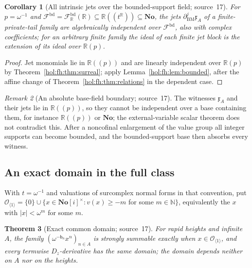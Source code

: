 \documentclass[11pt]{article}
\numberwithin{equation}{section}
\newtheorem{theorem}{Theorem}[section]
\newtheorem{corollary}[theorem]{Corollary}
\theoremstyle{definition}
\theoremstyle{remark}
\newtheorem{remark}[theorem]{Remark}
\newcommand{\R}{\mathbb R}
\newcommand{\N}{\mathbb N}
\newcommand{\No}{\mathbf{No}}
\newcommand{\abs}[1]{\lvert#1\rvert}
\begin{document}
\begin{corollary}[All intrinsic jets over the bounded-support field;
source~17]\label{hol:fh:cor:boundedjets}
For $p=\omega^{-1}$ and $\mathcal F^{\mathrm{bd}}=\mathcal F^{\mathrm{bd}}_\R(\R)
\subseteq\R((t^\R))\subseteq\No$, the jets $\partial_{\mathrm{BM}}^j\mathfrak x_A$
of a finite-private-tail family are algebraically independent over
$\mathcal F^{\mathrm{bd}}$, also with complex coefficients; for an arbitrary
finite family the ideal of each finite jet block is the extension of its
ideal over $\R(p)$.
\end{corollary}

\begin{proof}
Jet monomials lie in $\R((p))$ and are linearly independent over $\R(p)$ by
Theorem~\ref{hol:fh:thm:surreal}; apply Lemma~\ref{hol:fh:lem:bounded}, after
the affine change of Theorem~\ref{hol:fh:thm:relations} in the dependent case.
\end{proof}

\begin{remark}[An absolute base-field boundary; source~17]
\label{hol:fh:rem:absolute}
The witnesses $\mathfrak x_A$ and their jets lie in $\R((p))$, so they cannot be
independent over a base containing them, for instance $\R((p))$ or $\No$; the
external-variable scalar theorem does not contradict this. After a
noncofinal enlargement of the value group all integer supports can become
bounded, and the bounded-support base then absorbs every witness.
\end{remark}

\subsection{An exact domain in the full class}\label{hol:fh:sub:domain}

With $t=\omega^{-1}$ and valuations of surcomplex normal forms in that
convention, put
$\mathcal O_{\langle1\rangle}=\{0\}\cup\{x\in\No[i]^\times:v(x)\ge-m$ for some
$m\in\N\}$, equivalently the $x$ with $\abs x<\omega^m$ for some $m$.

\begin{theorem}[Exact common domain; source~17]\label{hol:fh:thm:domain}
For rapid heights and infinite $A$, the family $(\omega^{-\mathsf b_n}x^n)_{n\in A}$
is strongly summable exactly when $x\in\mathcal O_{\langle1\rangle}$, and every
termwise $D_z$-derivative has the same domain; the domain depends neither on
$A$ nor on the heights.
\end{theorem}
\end{document}
